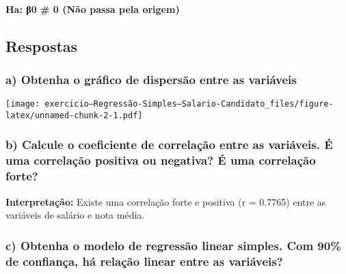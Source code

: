 \documentclass[
]{article}
\newenvironment{Shaded}{\begin{snugshade}}{\end{snugshade}}
\newcommand{\AttributeTok}[1]{\textcolor[rgb]{0.77,0.63,0.00}{#1}}
\newcommand{\CommentTok}[1]{\textcolor[rgb]{0.56,0.35,0.01}{\textit{#1}}}
\newcommand{\FunctionTok}[1]{\textcolor[rgb]{0.00,0.00,0.00}{#1}}
\newcommand{\NormalTok}[1]{#1}
\newcommand{\OtherTok}[1]{\textcolor[rgb]{0.56,0.35,0.01}{#1}}
\newcommand{\SpecialCharTok}[1]{\textcolor[rgb]{0.00,0.00,0.00}{#1}}
\newcommand{\StringTok}[1]{\textcolor[rgb]{0.31,0.60,0.02}{#1}}
\begin{document}
\hypertarget{ha-ux3b20-0-nuxe3o-passa-pela-origem}{%
\paragraph{Ha: β0 \# 0 (Não passa pela
origem)}\label{ha-ux3b20-0-nuxe3o-passa-pela-origem}}

\hypertarget{respostas}{%
\subsection{Respostas}\label{respostas}}

\hypertarget{a-obtenha-o-gruxe1fico-de-dispersuxe3o-entre-as-variuxe1veis}{%
\subsubsection{a) Obtenha o gráfico de dispersão entre as
variáveis}\label{a-obtenha-o-gruxe1fico-de-dispersuxe3o-entre-as-variuxe1veis}}

\texttt{[image: exercicio---Regressão-Simples---Salario-Candidato\_files/figure-latex/unnamed-chunk-2-1.pdf]}

\hypertarget{b-calcule-o-coeficiente-de-correlauxe7uxe3o-entre-as-variuxe1veis.-uxe9-uma-correlauxe7uxe3o-positiva-ou-negativa-uxe9-uma-correlauxe7uxe3o-forte}{%
\subsubsection{b) Calcule o coeficiente de correlação entre as
variáveis. É uma correlação positiva ou negativa? É uma correlação
forte?}\label{b-calcule-o-coeficiente-de-correlauxe7uxe3o-entre-as-variuxe1veis.-uxe9-uma-correlauxe7uxe3o-positiva-ou-negativa-uxe9-uma-correlauxe7uxe3o-forte}}

\textbf{Interpretação:} Existe uma correlação forte e positiva (r =
0.7765) entre as variáveis de salário e nota média.

\hypertarget{c-obtenha-o-modelo-de-regressuxe3o-linear-simples.-com-90-de-confianuxe7a-huxe1-relauxe7uxe3o-linear-entre-as-variuxe1veis}{%
\subsubsection{c) Obtenha o modelo de regressão linear simples. Com 90\%
de confiança, há relação linear entre as
variáveis?}\label{c-obtenha-o-modelo-de-regressuxe3o-linear-simples.-com-90-de-confianuxe7a-huxe1-relauxe7uxe3o-linear-entre-as-variuxe1veis}}

\begin{Shaded}
\end{Shaded}
\end{document}
